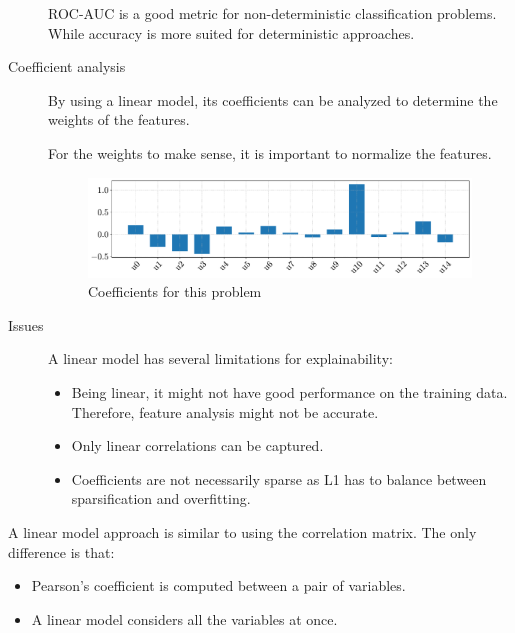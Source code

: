 \begin{description}
        \begin{remark}
            ROC-AUC is a good metric for non-deterministic classification problems. While accuracy is more suited for deterministic approaches.
        \end{remark}

    \item[Coefficient analysis]
        By using a linear model, its coefficients can be analyzed to determine the weights of the features.

        \begin{remark}
            For the weights to make sense, it is important to normalize the features.
        \end{remark}

        \begin{figure}[H]
            \centering
            \includegraphics[width=0.85\linewidth]{./img/_biomed_coeff_linear.pdf}
            \caption{Coefficients for this problem}
        \end{figure}

    \item[Issues]
        A linear model has several limitations for explainability:
        \begin{itemize}
            \item Being linear, it might not have good performance on the training data. Therefore, feature analysis might not be accurate.
            \item Only linear correlations can be captured.
            \item Coefficients are not necessarily sparse as L1 has to balance between sparsification and overfitting.
        \end{itemize}
\end{description}

\begin{remark}
    A linear model approach is similar to using the correlation matrix. The only difference is that:
    \begin{itemize}
        \item Pearson's coefficient is computed between a pair of variables.
        \item A linear model considers all the variables at once.
    \end{itemize}
\end{remark}



